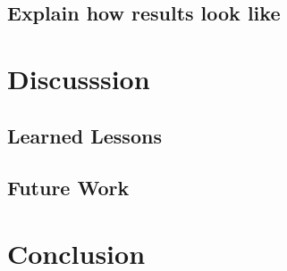 \subsection{Explain how results look like}

\section{Discusssion}
\subsection{Learned Lessons}
\subsection{Future Work}

\section{Conclusion}

\newpage


